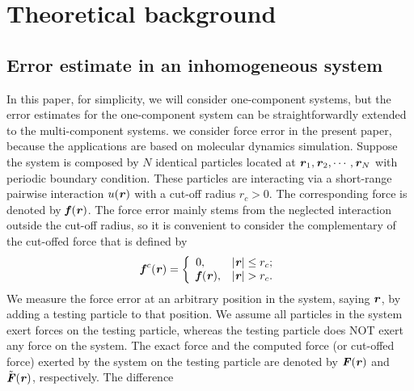\documentclass[aps,pre,preprint]{revtex4-1}
\renewcommand{\v}[1]{\textbf{\textit{#1}}}
\begin{document}
\section{Theoretical background}
\subsection{Error estimate in an inhomogeneous system}

In this paper, for simplicity,
we will consider one-component systems, but
the error estimates for
the one-component system can be straightforwardly extended to the
multi-component systems.  we consider
force error in the present paper, because the
applications are based on molecular dynamics simulation.
Suppose the system is composed by $N$ identical particles located at
$\v r_1, \v r_2, \cdots, \v r_N$ with periodic boundary condition.
These particles are interacting via a short-range pairwise interaction
$u(\v r)$ with a cut-off radius $r_c > 0$. The corresponding force is
denoted by $\v f(\v r)$. 
The force error mainly stems from the neglected interaction outside
the cut-off radius, so it is convenient to consider the complementary
of the cut-offed force that is defined by
\begin{align}
  \v f^c(\v r) =
  \left\{
  \begin{array}{ll}
    0, & \vert\v r\vert\leq r_c; \\
    \v f(\v r), & \vert\v r\vert > r_c.
  \end{array}
  \right.
\end{align}
We measure the force error at an arbitrary position in the system,
saying $\v r$, by adding a testing particle to that position.  We
assume all particles in the system exert forces on the testing
particle, whereas the testing particle does NOT exert any force on the
system.  The exact force and the computed force (or cut-offed force)
exerted by the system on the testing particle are denoted by ${\v
  F}(\v r)$ and $\tilde{\v F}(\v r)$, respectively.  The difference
\end{document}
